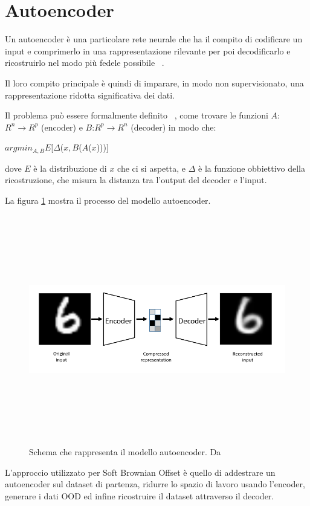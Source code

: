 \section{Autoencoder} 

Un autoencoder è una particolare rete neurale che ha il compito di codificare un input e comprimerlo in una rappresentazione rilevante per poi decodificarlo e ricostruirlo nel modo più fedele possibile ~\cite{bankAutoencoders2021}.

Il loro compito principale è quindi di imparare, in modo non supervisionato, una rappresentazione ridotta significativa dei dati.

Il problema può essere formalmente definito ~\cite{baldiAutoencodersUnsupervisedLearning}, come trovare le funzioni $A$:$ R^{n} \rightarrow R^p$ (encoder) e $B$:$ R^{p} \rightarrow R^n$ (decoder) in modo che:

\begin{center}
$arg min_{A,B} E$[$\Delta$($x,  B$($A$($x$)))] \\
\end{center}

dove $E$ è la distribuzione di $x$ che ci si aspetta, e $\Delta$ è la funzione obbiettivo della ricostruzione, che misura la distanza tra l'output del decoder e l'input.

La figura \ref{fig:ae_schema} mostra il processo del modello autoencoder.

\begin{figure}[htpb]
    \centering
    \includegraphics[width=\textwidth,height=10cm,keepaspectratio=true]{img/ae_schema.png}
    \caption{
        Schema che rappresenta il modello autoencoder. Da ~\cite{baldiAutoencodersUnsupervisedLearning}
    }
    \label{fig:ae_schema}
\end{figure}


L'approccio utilizzato per Soft Brownian Offset è quello di addestrare un autoencoder sul dataset di partenza, ridurre lo spazio di lavoro usando l'encoder, generare i dati OOD ed infine ricostruire il dataset attraverso il decoder.



